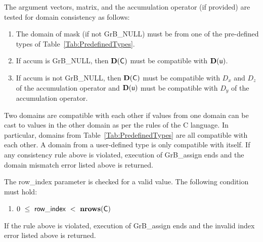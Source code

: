 The argument vectors, matrix, and the accumulation 
operator (if provided) are tested for domain consistency as follows:
\begin{enumerate}
	\item The domain of {\sf mask} (if not {\sf GrB\_NULL}) must be from one of 
    the pre-defined types of Table~\ref{Tab:PredefinedTypes}.

	\item If {\sf accum} is {\sf GrB\_NULL}, then $\bold{D}({\sf C})$ must be 
    compatible with $\bold{D}({\sf u})$.

	\item If {\sf accum} is not {\sf GrB\_NULL}, then $\bold{D}({\sf C})$ must be
    compatible with $D_x$ and $D_z$ of the accumulation operator and 
    $\bold{D}({\sf u})$ must be compatible with $D_y$ of the accumulation operator.
\end{enumerate}
Two domains are compatible with each other if values from one domain can be cast 
to values in the other domain as per the rules of the C language.
In particular, domains from Table~\ref{Tab:PredefinedTypes} are all compatible 
with each other. A domain from a user-defined type is only compatible with itself.
If any consistency rule above is violated, execution of {\sf GrB\_assign} ends
and the domain mismatch error listed above is returned.

The {\sf row\_index} parameter is checked for a valid value.  The following
condition must hold:
\begin{enumerate}
	\item $0\ \leq\ {\sf row\_index} \ <\ \bold{nrows}({\sf C})$
\end{enumerate}
If the rule above is violated, execution of {\sf GrB\_assign} ends 
and the invalid index error listed above is returned.

